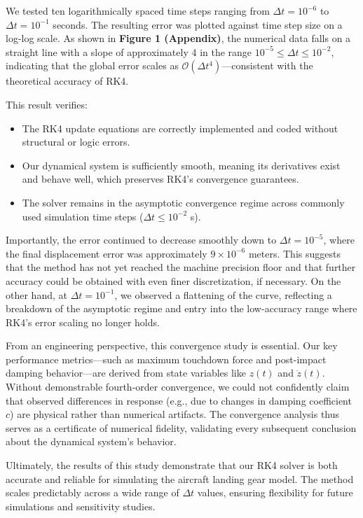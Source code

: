 \documentclass[12pt,letterpaper, onecolumn]{exam}
\begin{document}
\begin{questions}
\begin{solution}
\begin{parts}
        We tested ten logarithmically spaced time steps ranging from $\Delta t = 10^{-6}$ to $\Delta t = 10^{-1}$ seconds. The resulting error was plotted against time step size on a log-log scale. As shown in \textbf{Figure 1 (Appendix)}, the numerical data falls on a straight line with a slope of approximately 4 in the range $10^{-5} \leq \Delta t \leq 10^{-2}$, indicating that the global error scales as $\mathcal{O}(\Delta t^4)$—consistent with the theoretical accuracy of RK4.

        This result verifies:
        \begin{itemize}
            \item The RK4 update equations are correctly implemented and coded without structural or logic errors.
            \item Our dynamical system is sufficiently smooth, meaning its derivatives exist and behave well, which preserves RK4’s convergence guarantees.
            \item The solver remains in the asymptotic convergence regime across commonly used simulation time steps ($\Delta t \leq 10^{-2}$ s).
        \end{itemize}
        
        Importantly, the error continued to decrease smoothly down to $\Delta t = 10^{-5}$, where the final displacement error was approximately $9 \times 10^{-6}$ meters. This suggests that the method has not yet reached the machine precision floor and that further accuracy could be obtained with even finer discretization, if necessary. On the other hand, at $\Delta t = 10^{-1}$, we observed a flattening of the curve, reflecting a breakdown of the asymptotic regime and entry into the low-accuracy range where RK4’s error scaling no longer holds.
        
        From an engineering perspective, this convergence study is essential. Our key performance metrics—such as maximum touchdown force and post-impact damping behavior—are derived from state variables like $z(t)$ and $\dot{z}(t)$. Without demonstrable fourth-order convergence, we could not confidently claim that observed differences in response (e.g., due to changes in damping coefficient $c$) are physical rather than numerical artifacts. The convergence analysis thus serves as a certificate of numerical fidelity, validating every subsequent conclusion about the dynamical system’s behavior.
        
        Ultimately, the results of this study demonstrate that our RK4 solver is both accurate and reliable for simulating the aircraft landing gear model. The method scales predictably across a wide range of $\Delta t$ values, ensuring flexibility for future simulations and sensitivity studies.



\end{parts}
\end{solution}
\end{questions}
\end{document}
